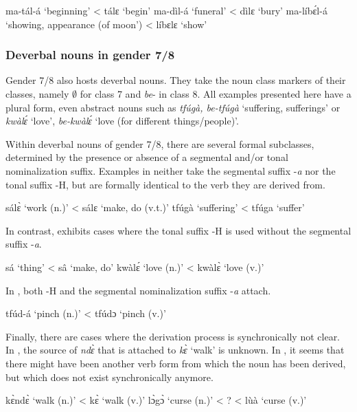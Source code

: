 \ea \label{eventN3}
\ea  ma-tál-á `beginning' < tálɛ `begin'
\ex ma-dìl-á `funeral' < dìlɛ `bury' 
\ex\label{eventN3c} ma-líbɛ́l-á `showing, appearance (of moon') < líbɛlɛ `show'
\z
\z


\largerpage

\subsubsection{Deverbal nouns in gender 7/8}
\label{NOM78}



Gender 7/8 also hosts deverbal nouns. They take the noun class markers of their classes, namely $\emptyset$ for class 7 and {\itshape be}- in class 8. All examples presented here have a plural form, even abstract nouns such as {\itshape tfúgà, be-tfúgà} `suffering, sufferings' or {\itshape kwàlɛ́} `love', {\itshape be-kwàlɛ́} `love (for different things/people)'.

Within deverbal nouns of gender 7/8, there are several formal subclasses, determined by the presence or absence of a segmental and/or tonal nominalization suffix. Examples in  neither take the segmental suffix -{\itshape a} nor the tonal suffix -H, but are formally identical to the verb they are derived from.

\ea \label{78N1}
\ea  sálɛ̀ `work (n.)' < sálɛ `make, do (v.t.)'
\ex tfúgà `suffering' < tfúga `suffer'
\z
\z

\noindent In contrast,  exhibits cases where the  tonal suffix -H is used without the segmental suffix -{\itshape a}.

\ea \label{78N2}
\ea  sá `thing' < sâ `make, do'
\ex kwàlɛ́ `love (n.)' < kwàlɛ̀ `love (v.)'
\z
\z

\noindent In , both -H  and the segmental nominalization suffix -{\itshape a} attach.

\ea \label{78N3} tfúd-á `pinch (n.)' < tfúdɔ `pinch (v.)'
\z

Finally, there are cases where the derivation process is synchronically not clear. In , the source of {\itshape ndɛ̀} that is attached to {\itshape kɛ̀} `walk' is unknown. In , it seems that there might have been another verb form from which the noun has been derived, but which does not exist synchronically anymore.

\ea \label{78N4}
\ea \label{78N4a} kɛ̀ndɛ̀ `walk (n.)' <  kɛ̀ `walk (v.)'
\ex\label{78N4b} lɔ̀gɔ̀ `curse (n.)' < ? <  lùà `curse (v.)' 
\z
\z


